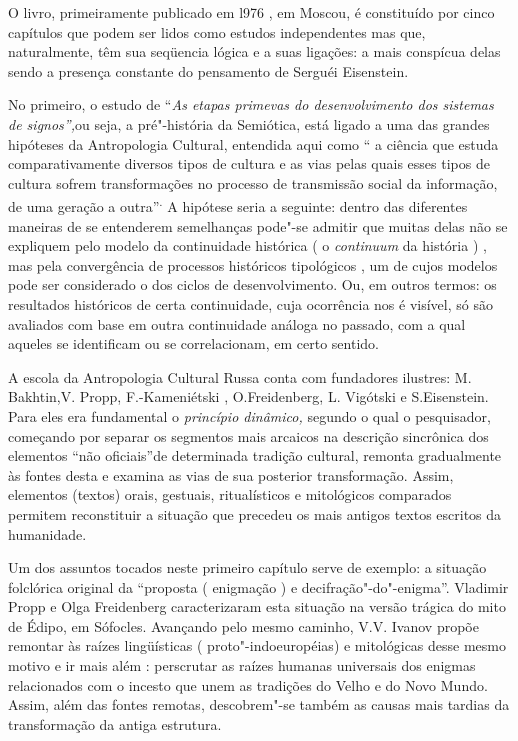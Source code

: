 O livro, primeiramente publicado em l976 , em Moscou, é constituído por
cinco capítulos que podem ser lidos como estudos independentes mas que,
naturalmente, têm sua seqüencia lógica e a suas ligações: a mais
conspícua delas sendo a presença constante do pensamento de Serguéi
Eisenstein.

No primeiro, o estudo de ``\emph{As etapas primevas do desenvolvimento
dos sistemas de signos'',}ou seja, a pré"-história da Semiótica, está
ligado a uma das grandes hipóteses da Antropologia Cultural, entendida
aqui como `` a ciência que estuda comparativamente diversos tipos de
cultura e as vias pelas quais esses tipos de cultura sofrem
transformações no processo de transmissão social da informação, de uma
geração a outra''\textsuperscript{.} A hipótese seria a seguinte: dentro
das diferentes maneiras de se entenderem semelhanças pode"-se admitir que
muitas delas não se expliquem pelo modelo da continuidade histórica ( o
\emph{continuum} da história ) , mas pela convergência de processos
históricos tipológicos , um de cujos modelos pode ser considerado o dos
ciclos de desenvolvimento. Ou, em outros termos: os resultados
históricos de certa continuidade, cuja ocorrência nos é visível, só são
avaliados com base em outra continuidade análoga no passado, com a qual
aqueles se identificam ou se correlacionam, em certo sentido.

A escola da Antropologia Cultural Russa conta com fundadores ilustres:
M. Bakhtin,V. Propp, F.-Kameniétski , O.Freidenberg, L. Vigótski e
S.Eisenstein. Para eles era fundamental o \emph{princípio dinâmico,}
segundo o qual o pesquisador, começando por separar os segmentos mais
arcaicos na descrição sincrônica dos elementos ``não oficiais''de
determinada tradição cultural, remonta gradualmente às fontes desta e
examina as vias de sua posterior transformação. Assim, elementos
(textos) orais, gestuais, ritualísticos e mitológicos comparados
permitem reconstituir a situação que precedeu os mais antigos textos
escritos da humanidade.

Um dos assuntos tocados neste primeiro capítulo serve de exemplo: a
situação folclórica original da ``proposta ( enigmação ) e
decifração"-do"-enigma''. Vladimir Propp e Olga Freidenberg caracterizaram
esta situação na versão trágica do mito de Édipo, em Sófocles. Avançando
pelo mesmo caminho, V.V. Ivanov propõe remontar às raízes lingüísticas (
proto"-indoeuropéias) e mitológicas desse mesmo motivo e ir mais além :
perscrutar as raízes humanas universais dos enigmas relacionados com o
incesto que unem as tradições do Velho e do Novo Mundo. Assim, além das
fontes remotas, descobrem"-se também as causas mais tardias da
transformação da antiga estrutura.

